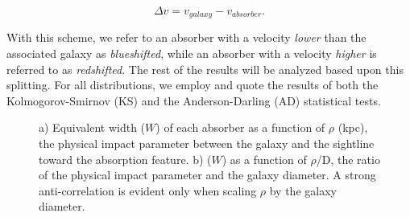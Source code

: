 \documentclass[iop]{emulateapj-rtx4}
\begin{document}
\begin{equation}
	\Delta v = v_{galaxy} - v_{absorber}.
\end{equation}

With this scheme, we refer to an absorber with a velocity \textit{lower} than the associated galaxy as \textit{blueshifted}, while an absorber with a velocity \textit{higher} is referred to as \textit{redshifted}. The rest of the results will be analyzed based upon this splitting. For all distributions, we employ and quote the results of both the Kolmogorov-Smirnov (KS) and the Anderson-Darling (AD) statistical tests.

\begin{figure}[ht!]
  \centering
  \vspace{-2pt}
  \caption{a) Equivalent width ($W$) of each absorber as a function of $\rho$ (kpc), the physical impact parameter between the galaxy and the sightline toward the absorption feature. b) ($W$) as a function of $\rho$/D, the ratio of the physical impact parameter and the galaxy diameter. A strong anti-correlation is evident only when scaling $\rho$ by the galaxy diameter.}
\end{figure}
\vspace{10pt}
\end{document}
